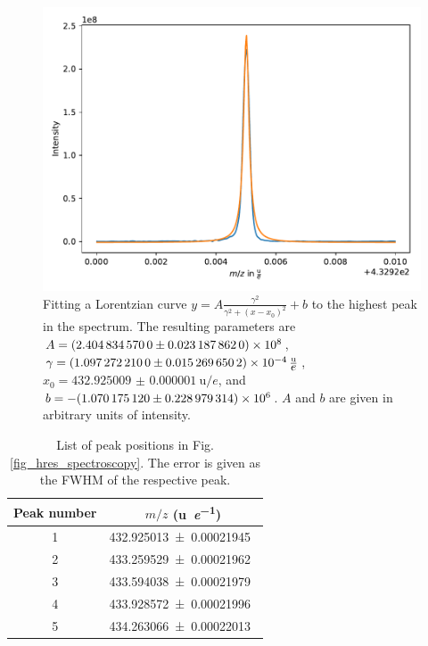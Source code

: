 \documentclass[a4paper,10pt]{article}
\begin{document}
\begin{figure}[htp!]
	\centering
	\includegraphics[width = 0.6 \textwidth]{fit_hires.pdf}
	\caption{Fitting a Lorentzian curve $y = A \frac{\gamma^2}{\gamma^2 + (x - x_0)^2} + b$ to the highest peak in the spectrum. The resulting parameters are $A = \num{2.40483457 \pm 0.0231878620 e8}$, $\gamma = \SI{1.09727221 \pm 0.0152696502 e-04}{\atomicmassunit \per \elementarycharge}$, $x_0 = \SI{432.925009(1)}{\atomicmassunit \per \elementarycharge}$, and $b = -\SI{1.07017512 \pm 0.228979314 e06}{}$. $A$ and $b$ are given in arbitrary units of intensity. }
	\label{fig_fit_hires}
\end{figure}

\begin{table}[htp!]
	\centering
	\caption{List of peak positions in Fig. \ref{fig_hres_spectroscopy}. The error is given as the FWHM of the respective peak.}
	\begin{tabular}{c | c }
		Peak number & $m/z$ (\si{\atomicmassunit \per \elementarycharge})\\ \hline
		1 & \SI{432.925013 \pm 0.00021945}{ }\\
		2 & \SI{433.259529 \pm 0.00021962}{ }\\
		3 & \SI{433.594038 \pm 0.00021979}{ }\\
		4 & \SI{433.928572 \pm 0.00021996}{ }\\
		5 & \SI{434.263066 \pm 0.00022013}{ }\\
	\end{tabular}
	\label{tab_peaks_spectrum}
\end{table}

\newpage
\end{document}
